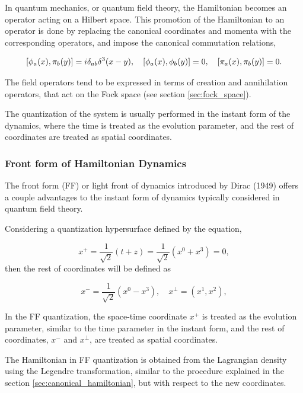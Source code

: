 \documentclass[11pt,a4paper,twoside,pdf]{article}
\numberwithin{equation}{section}
\begin{document}
In quantum mechanics, or quantum field theory, the Hamiltonian becomes an operator 
acting on a Hilbert space. This promotion of the Hamiltonian to an operator is done by
replacing the canonical coordinates and momenta with the corresponding operators, 
and impose the canonical commutation relations,

\begin{equation}
    \left[ \phi_a (x), \pi_b (y) \right] = i \delta_{ab} \delta^3(x-y),
    \quad \left[ \phi_a (x), \phi_b (y) \right] = 0, \quad
    \left[ \pi_a (x), \pi_b (y) \right] = 0.
\end{equation}

The field operators tend to be expressed in terms of creation and annihilation operators,
that act on the Fock space (see section \ref{sec:fock_space}).

The quantization of the system is usually performed in the instant form of the 
dynamics, where the time is treated as the evolution parameter, and the rest of
coordinates are treated as spatial coordinates. 

\subsubsection{Front form of Hamiltonian Dynamics}

The front form (FF) or light front of dynamics introduced by Dirac (1949) 
\cite{dirac_front_forms_1949} offers a couple advantages to the instant form of 
dynamics typically considered in quantum field theory. 

Considering a quantization hypersurface defined by the equation,

\begin{equation}
    x^+ = \frac{1}{\sqrt{2}} (t+z) = \frac{1}{\sqrt{2}} (x^0 + x^3) = 0,
\end{equation}
then the rest of coordinates will be defined as

\begin{equation}
    x^- = \frac{1}{\sqrt{2}} (x^0-x^3), \quad x^\perp = (x^1, x^2),
\end{equation}

In the FF quantization, the space-time coordinate $x^+$ is treated as the evolution 
parameter, similar to the time parameter in the instant form, and the rest of 
coordinates, $x^-$ and $x^\perp$, are treated as spatial coordinates.

The Hamiltonian in FF quantization is obtained from the Lagrangian density using 
the Legendre transformation, similar to the procedure explained in the section
\ref{sec:canonical_hamiltonian}, but with respect to the new coordinates.
\end{document}
